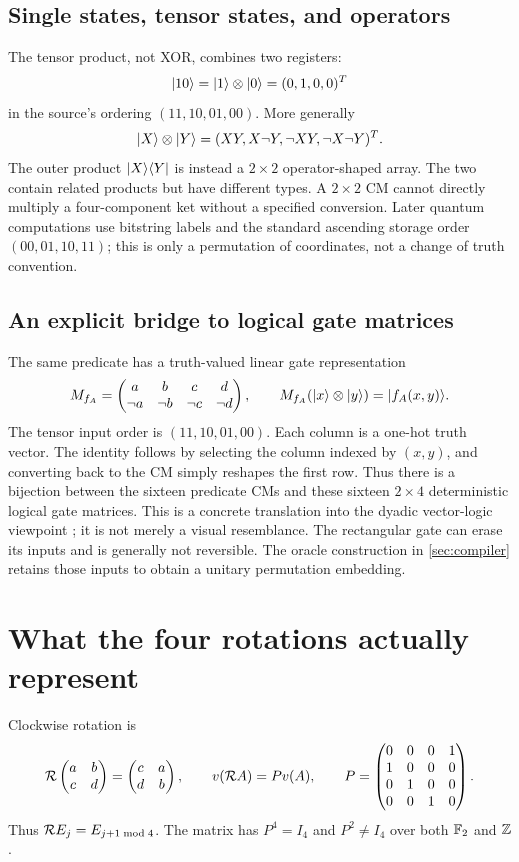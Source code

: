 \subsection{Single states, tensor states, and operators}
The tensor product, not XOR, combines two registers:
\begin{equation}
 \lvert 10\rangle=\lvert 1\rangle\otimes\lvert 0\rangle=(0,1,0,0)^T
\end{equation}
in the source's ordering $(11,10,01,00)$. More generally
\begin{equation}
 \lvert X\rangle\otimes\lvert Y\rangle=(XY,X\neg Y,\neg XY,\neg X\neg Y)^T.
\end{equation}
The outer product $\lvert X\rangle\langle Y\rvert$ is instead a $2\times2$ operator-shaped array. The two contain related products but have different types. A $2\times2$ CM cannot directly multiply a four-component ket without a specified conversion. Later quantum computations use bitstring labels and the standard ascending storage order $(00,01,10,11)$; this is only a permutation of coordinates, not a change of truth convention.


\subsection{An explicit bridge to logical gate matrices}\label{sec:logicalgate}
The same predicate has a truth-valued linear gate representation
\begin{equation}\label{eq:logicalgate}
 M_{f_A}=\begin{pmatrix}a&b&c&d\\\neg a&\neg b&\neg c&\neg d\end{pmatrix},
 \qquad M_{f_A}(\lvert x\rangle\otimes\lvert y\rangle)=\lvert f_A(x,y)\rangle.
\end{equation}
The tensor input order is $(11,10,01,00)$. Each column is a one-hot truth vector. The identity follows by selecting the column indexed by $(x,y)$, and converting back to the CM simply reshapes the first row. Thus there is a bijection between the sixteen predicate CMs and these sixteen $2\times4$ deterministic logical gate matrices. This is a concrete translation into the dyadic vector-logic viewpoint \cite{mizraji2008}; it is not merely a visual resemblance. The rectangular gate can erase its inputs and is generally not reversible. The oracle construction in \cref{sec:compiler} retains those inputs to obtain a unitary permutation embedding.

\section{What the four rotations actually represent}\label{sec:rotation}
Clockwise rotation is
\begin{equation}
 \mathcal R\begin{pmatrix}a&b\\c&d\end{pmatrix}=\begin{pmatrix}c&a\\d&b\end{pmatrix},\qquad
 v(\mathcal R A)=Pv(A),\qquad
 P=\begin{pmatrix}0&0&0&1\\1&0&0&0\\0&1&0&0\\0&0&1&0\end{pmatrix}.
\end{equation}
Thus $\mathcal R E_j=E_{j+1\bmod4}$. The matrix has $P^4=I_4$ and $P^2\ne I_4$ over both $\mathbb F_2$ and $\mathbb Z$.

